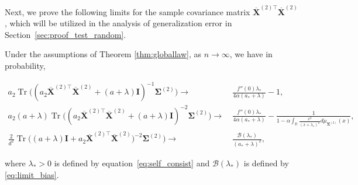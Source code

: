 \documentclass[twoside,11pt]{article}
\newcommand{\R}{\mathbb{R}}
\def\bI{{\mathbf I}}
\def\bX{{\boldsymbol X}}
\def\bSigma{{\boldsymbol \Sigma}}
\newcommand{\Tr}{\operatorname{Tr}}
\newcommand{\1}{\mathbf{1}}
\begin{document}
Next,  we prove the following limits for the sample covariance matrix $\overline{\bX}^{(2)\top}\overline{\bX}^{(2)}$, which will be utilized in the analysis of generalization error in Section~\ref{sec:proof_test_random}. 


\begin{lemma}\label{eq:deterministic_equ}
    Under the assumptions of Theorem \ref{thm:globallaw}, as $n\to\infty$, we have in probability, 
    \begin{small}
    \begin{align}
a_2\Tr\big((a_2\overline{\bX}^{(2)\top}\overline{\bX}^{(2)}+(a+\lambda)\bI)^{-1}\bSigma^{(2)}\big)\to ~& \frac{f''(0)\lambda_*}{4\alpha(a_*+\lambda)}-1,\\
a_2(a+\lambda)\Tr\big((a_2\overline{\bX}^{(2)\top}\overline{\bX}^{(2)}+(a+\lambda)\bI)^{-2}\bSigma^{(2)}\big)\to ~& \frac{f''(0)\lambda_*}{4\alpha(a_*+\lambda)}-\frac{1}{1-\alpha\int_{\R}\frac{x^2}{(x+\lambda_*)^2}d\mu_{\bSigma^{(2)}}(x)},\\
        \frac{2}{d^2}\Tr\big((a +\lambda)\bI+a_2\overline\bX^{(2)\top}\overline\bX^{(2)}\big)^{-2}\bSigma^{(2)}\big)  \to ~& \frac{\mathcal{B}(\lambda_*)}{(a_*+\lambda)^2},
    \end{align}
        \end{small}
where $\lambda_*>0$ is defined by  equation~\eqref{eq:self_consist} and $\mathcal{B}(\lambda_*)$ is defined by \eqref{eq:limit_bias}.
\end{lemma}
\end{document}
